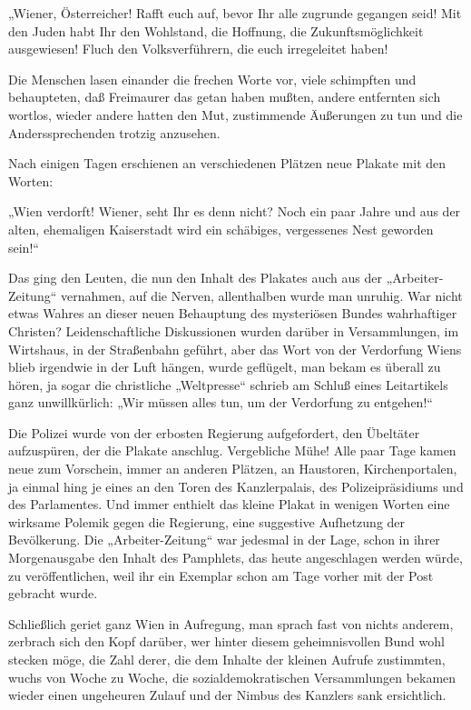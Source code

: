 „Wiener, Österreicher! Rafft euch auf, bevor Ihr alle zugrunde
gegangen seid! Mit den Juden habt Ihr den Wohlstand, die Hoffnung,
die Zukunftsmöglichkeit ausgewiesen! Fluch den Volksverführern, die
euch irregeleitet haben!


Die Menschen lasen einander die frechen Worte vor, viele schimpften
und behaupteten, daß Freimaurer das getan haben mußten, andere
entfernten sich wortlos, wieder andere hatten den Mut, zustimmende
Äußerungen zu tun und die Anderssprechenden trotzig anzusehen.

Nach einigen Tagen erschienen an verschiedenen Plätzen neue Plakate
mit den Worten:

„Wien verdorft! Wiener, seht Ihr es denn nicht? Noch ein paar Jahre
und aus der alten, ehemaligen Kaiserstadt wird ein schäbiges,
vergessenes Nest geworden sein!“

Das ging den Leuten, die nun den Inhalt des Plakates auch aus der
„Arbeiter-Zeitung“ vernahmen, auf die Nerven, allenthalben wurde
man unruhig. War nicht etwas Wahres an dieser neuen Behauptung des
mysteriösen Bundes wahrhaftiger Christen? Leidenschaftliche
Diskussionen wurden darüber in Versammlungen, im Wirtshaus, in der
Straßenbahn geführt, aber das Wort  von der
Verdorfung Wiens blieb irgendwie in der Luft hängen, wurde
geflügelt, man bekam es überall zu hören, ja sogar die christliche
„Weltpresse“ schrieb am Schluß eines Leitartikels ganz
unwillkürlich: „Wir müssen alles tun, um der Verdorfung zu
entgehen!“

Die Polizei wurde von der erbosten Regierung aufgefordert, den
Übeltäter aufzuspüren, der die Plakate anschlug. Vergebliche Mühe!
Alle paar Tage kamen neue zum Vorschein, immer an anderen Plätzen,
an Haustoren, Kirchenportalen, ja einmal hing je eines an den Toren
des Kanzlerpalais, des Polizeipräsidiums und des Parlamentes. Und
immer enthielt das kleine Plakat in wenigen Worten eine wirksame
Polemik gegen die Regierung, eine suggestive Aufhetzung der
Bevölkerung. Die „Arbeiter-Zeitung“ war jedesmal in der Lage, schon
in ihrer Morgenausgabe den Inhalt des Pamphlets, das heute
angeschlagen werden würde, zu veröffentlichen, weil ihr ein
Exemplar schon am Tage vorher mit der Post gebracht wurde.

Schließlich geriet ganz Wien in Aufregung, man sprach fast von
nichts anderem, zerbrach sich den Kopf darüber, wer hinter diesem
geheimnisvollen Bund wohl stecken möge, die Zahl derer, die dem
Inhalte der kleinen Aufrufe zustimmten, wuchs von Woche zu Woche,
die sozialdemokratischen Versammlungen bekamen wieder einen
ungeheuren Zulauf und der Nimbus des Kanzlers sank ersichtlich.

